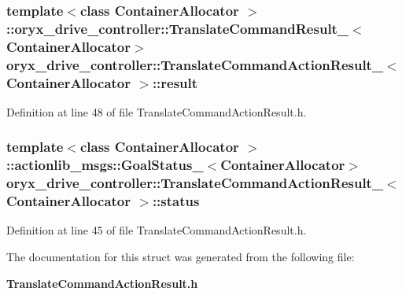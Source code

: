 \subsubsection[{result}]{\setlength{\rightskip}{0pt plus 5cm}template$<$class Container\-Allocator $>$ \-::{\bf oryx\-\_\-drive\-\_\-controller\-::\-Translate\-Command\-Result\-\_\-}$<$\-Container\-Allocator$>$ {\bf oryx\-\_\-drive\-\_\-controller\-::\-Translate\-Command\-Action\-Result\-\_\-}$<$ \-Container\-Allocator $>$\-::{\bf result}}\label{structoryx__drive__controller_1_1TranslateCommandActionResult___ab5e67d41d398e0f85f9c994b5883f0b7}


\-Definition at line 48 of file \-Translate\-Command\-Action\-Result.\-h.

\subsubsection[{status}]{\setlength{\rightskip}{0pt plus 5cm}template$<$class Container\-Allocator $>$ \-::actionlib\-\_\-msgs\-::\-Goal\-Status\-\_\-$<$\-Container\-Allocator$>$ {\bf oryx\-\_\-drive\-\_\-controller\-::\-Translate\-Command\-Action\-Result\-\_\-}$<$ \-Container\-Allocator $>$\-::{\bf status}}\label{structoryx__drive__controller_1_1TranslateCommandActionResult___a2757509959b0b333a5faa38a36c22822}


\-Definition at line 45 of file \-Translate\-Command\-Action\-Result.\-h.



\-The documentation for this struct was generated from the following file\-:\begin{DoxyCompactItemize}
\item 
{\bf \-Translate\-Command\-Action\-Result.\-h}\end{DoxyCompactItemize}
